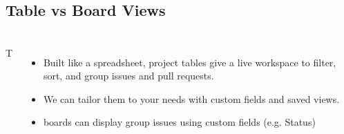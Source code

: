 \subsection{Table vs Board Views}
\begin{frame}
  \frametitle{\insertsectionhead}
  \framesubtitle{\insertsubsectionhead}
  \begin{columns}{T}
    \begin{itemize}
        \item Built like a spreadsheet, project tables give a live workspace to filter, sort, and group issues and pull requests. 
        \item We can tailor them to your needs with custom fields and saved views.
        \item boards can display group issues using custom fields (e.g. Status)
    \end{itemize}
  \end{columns}
\end{frame}

